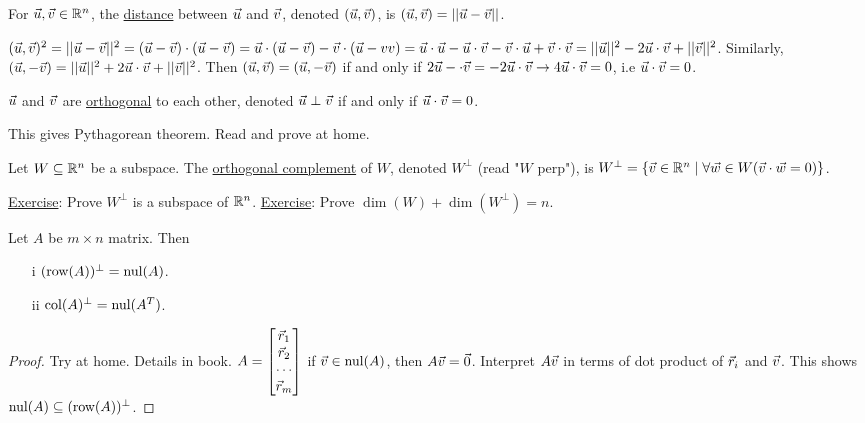 \documentclass[10pt,a4paper]{article}
\begin{document}
\begin{definition}
	For $\vec{u},\vec{v}\in\mathbb{R}^n$, the \underline{distance} between $\vec{u}$ and $\vec{v}$, denoted $(\vec{u},\vec{v})$, is $(\vec{u},\vec{v})=||\vec{u}-\vec{v}||$.
\end{definition}
\begin{example}
	$(\vec{u},\vec{v})^2 = ||\vec{u}-\vec{v}||^2 = (\vec{u}-\vec{v})\cdot(\vec{u}-\vec{v}) = \vec{u}\cdot(\vec{u}-\vec{v})-\vec{v}\cdot(\vec{u}-vv) = \vec{u}\cdot\vec{u}-\vec{u}\cdot\vec{v}-\vec{v}\cdot\vec{u}+\vec{v}\cdot\vec{v}=||\vec{u}||^2-2\vec{u}\cdot\vec{v}+||\vec{v}||^2$.
	Similarly, $(\vec{u},-\vec{v}) = ||\vec{u}||^2 + 2\vec{u}\cdot\vec{v}+||\vec{v}||^2$.
	Then $(\vec{u},\vec{v})=(\vec{u},-\vec{v})$ if and only if $2\vec{u}-\cdot\vec{v} = -2\vec{u}\cdot\vec{v} \rightarrow 4\vec{u}\cdot\vec{v} = 0$, i.e $\vec{u}\cdot\vec{v} = 0$.
\end{example}
\begin{definition}
	$\vec{u}$ and $\vec{v}$ are \underline{orthogonal} to each other, denoted $\vec{u} \perp \vec{v}$ if and only if $\vec{u}\cdot\vec{v} = 0$.
\end{definition}
\begin{note}
	This gives Pythagorean theorem. Read and prove at home.
\end{note}
\begin{definition}
	Let $W\subseteq\mathbb{R}^n$ be a subspace. The \underline{orthogonal complement} of $W$, denoted $W^\perp$ (read "$W$ perp"), is $W^\perp=\{\vec{v}\in\mathbb{R}^n\mid \forall \vec{w}\in W(\vec{v}\cdot\vec{w}=0)\}$.
\end{definition}
\underline{Exercise}: Prove $W^\perp$ is a subspace of $\mathbb{R}^n$.
\underline{Exercise}: Prove $\dim(W)+\dim(W^\perp) = n$.
\begin{theorem}
	Let $A$ be $m\times n$ matrix. Then
	\begin{enumerate}
		\item[i] $(\text{row}(A))^\perp = \text{nul}(A)$.
		\item[ii] $\text{col}(A)^\perp = \text{nul}(A^T)$.
	\end{enumerate}
\end{theorem}
\begin{proof}
	Try at home. Details in book.
	$A = \begin{bmatrix}\vec{r}_1\\ \vec{r}_2 \\ \cdots \\ \vec{r}_m\end{bmatrix}$ if $\vec{v}\in\text{nul}(A)$, then $A\vec{v}=\vec{0}$. Interpret $A\vec{v}$ in terms of dot product of $\vec{r}_i$ and $\vec{v}$. This shows $\text{nul}(A) \subseteq (\text{row}(A))^\perp$.
\end{proof}
\end{document}
